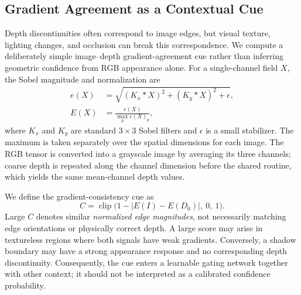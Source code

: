 \subsection{Gradient Agreement as a Contextual Cue}
Depth discontinuities often correspond to image edges, but visual texture, lighting changes, and occlusion can break this correspondence. We compute a deliberately simple image--depth gradient-agreement cue rather than inferring geometric confidence from RGB appearance alone. For a single-channel field $X$, the Sobel magnitude and normalization are
\begin{align}
e(X)&=\sqrt{(K_x*X)^2+(K_y*X)^2+\epsilon},\\
E(X)&=\frac{e(X)}{\max_{p}e(X)_p},
\label{eq:edge}
\end{align}
where $K_x$ and $K_y$ are standard $3\times3$ Sobel filters and $\epsilon$ is a small stabilizer. The maximum is taken separately over the spatial dimensions for each image. The RGB tensor is converted into a grayscale image by averaging its three channels; coarse depth is repeated along the channel dimension before the shared routine, which yields the same mean-channel depth values.

We define the gradient-consistency cue as
\begin{equation}
C=\operatorname{clip}\bigl(1-|E(I)-E(D_0)|,\ 0,\ 1\bigr).
\label{eq:cgrad}
\end{equation}
Large $C$ denotes similar \emph{normalized edge magnitudes}, not necessarily matching edge orientations or physically correct depth. A large score may arise in textureless regions where both signals have weak gradients. Conversely, a shadow boundary may have a strong appearance response and no corresponding depth discontinuity. Consequently, the cue enters a learnable gating network together with other context; it should not be interpreted as a calibrated confidence probability.

